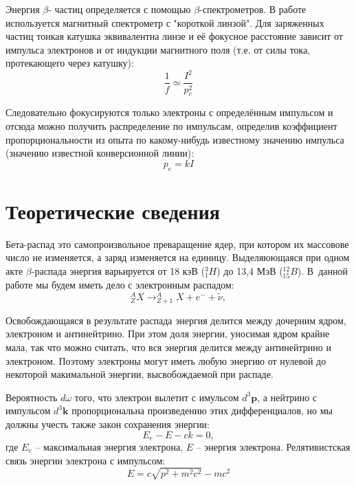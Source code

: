 \documentclass[a4paper,12pt]{article}
\theoremstyle{plain} %
\theoremstyle{definition} %
\theoremstyle{remark} %
\begin{document}
Энергия $\beta$- частиц определяется с помощью $\beta$-спектрометров. В работе используется магнитный спектрометр с "короткой линзой". Для заряженных частиц тонкая катушка эквивалентна линзе и её фокусное расстояние зависит от импульса электронов и от индукции магнитного поля (т.е. от силы тока, протекающего через катушку):
\begin{equation}
\frac{1}{f} \simeq \frac{I^2}{p_e^2}
\end{equation}

Следовательно фокусируются только электроны с определённым импульсом и отсюда можно получить распределение по импульсам, определив коэффициент пропорциональности из опыта по какому-нибудь известному значению импульса (значению известной конверсионной линии): 
\begin{equation}
p_e = kI
\end{equation}


\section*{Теоретические сведения}
	Бета-распад это самопроизвольное преваращение ядер, при котором их массовове число не изменяется, а заряд изменяется на единицу. Выделяюющаяся при одном акте $\beta$-распада энергия варьируется от 18 кэВ ($^{3}_{1}H$) до 13,4 МэВ ($^{12}_{15}B$). В~данной работе мы будем иметь дело с электронным распадом:\\
	\begin{equation}
	_{Z}^{A}X \rightarrow ^{A}_{Z+1}X + e^{-} + \widetilde{\nu},
	\end{equation}
	
	Освобождающаяся в результате распада энергия делится между дочерним ядром, электроном и антинейтрино. При этом доля энергии, уносимая ядром крайне мала, так что можно считать, что вся энергия делится между антинейтрино и электроном. Поэтому электроны могут иметь любую энергию от нулевой до некоторой макимальной энергии, высвобождаемой при распаде.
	
	Вероятность $d\omega$ того, что электрон вылетит с имульсом $d^3\mathbf{p}$, а нейтрино с импульсом $d^3\mathbf{k}$ пропорциональна произведению этих дифференциалов, но мы должны учесть также закон сохранения энергии:
	\begin{equation}
	E_e - E - ck = 0,
	\label{zse}
	\end{equation}
	где $E_e$ -- максимальная энергия электрона, $E$ -- энергия электрона. Релятивистская связь энергии электрона с импульсом:
	\begin{equation}
	E = c\sqrt{p^2 + m^2c^2} -mc^2
	\end{equation}
	
\end{document}
